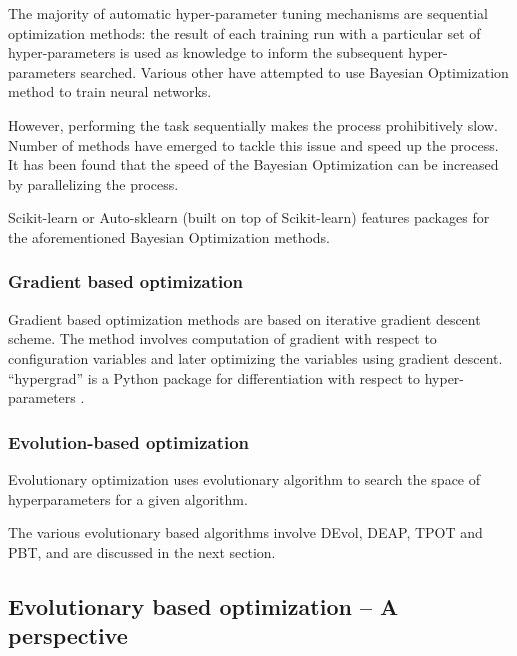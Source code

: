 The majority of automatic hyper-parameter tuning mechanisms are sequential optimization methods: the result of each training run with a particular set of hyper-parameters is used as knowledge to inform the subsequent hyper-parameters searched\cite{jaderberg2017population}. Various other have attempted to use Bayesian Optimization method to train neural networks\cite{srinivas2009gaussian}.

However, performing the task sequentially makes the process prohibitively slow. Number of methods have emerged to tackle this issue and speed up the process\cite{domhan2015speeding}. It has been found that the speed of the Bayesian Optimization can be increased by parallelizing the process\cite{gonzalez2016batch}.


Scikit-learn or Auto-sklearn (built on top of Scikit-learn) features packages for the aforementioned Bayesian Optimization methods\cite{feurer2015efficient}.


\subsubsection{Gradient based optimization}

Gradient based optimization methods are based on iterative gradient descent scheme. The method involves computation of gradient with respect to configuration variables and later optimizing the variables using gradient descent\cite{larsen1996design}. “hypergrad” is a Python package for differentiation with respect to hyper-parameters \cite{maclaurin2015gradient}.

\subsubsection{Evolution-based optimization}

Evolutionary optimization uses evolutionary algorithm to search the space of hyperparameters for a given algorithm\cite{bergstra2011algorithms}. 

The various evolutionary based algorithms involve DEvol, DEAP, TPOT and PBT, and are discussed in the next section. 

\subsection{Evolutionary based optimization – A perspective}

